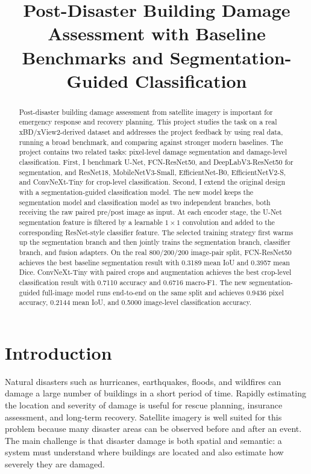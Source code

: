 \documentclass[10pt,conference]{IEEEtran}
\title{Post-Disaster Building Damage Assessment with Baseline Benchmarks and Segmentation-Guided Classification}
\author{
    \IEEEauthorblockN{Student Name}
    \IEEEauthorblockA{
        ECE 228 Project Report\\
        University of California, San Diego\\
        Email: your.email@ucsd.edu
    }
}
\begin{document}
\maketitle

\begin{abstract}
Post-disaster building damage assessment from satellite imagery is important for emergency response and recovery planning. This project studies the task on a real xBD/xView2-derived dataset and addresses the project feedback by using real data, running a broad benchmark, and comparing against stronger modern baselines. The project contains two related tasks: pixel-level damage segmentation and damage-level classification. First, I benchmark U-Net, FCN-ResNet50, and DeepLabV3-ResNet50 for segmentation, and ResNet18, MobileNetV3-Small, EfficientNet-B0, EfficientNetV2-S, and ConvNeXt-Tiny for crop-level classification. Second, I extend the original design with a segmentation-guided classification model. The new model keeps the segmentation model and classification model as two independent branches, both receiving the raw paired pre/post image as input. At each encoder stage, the U-Net segmentation feature is filtered by a learnable $1\times1$ convolution and added to the corresponding ResNet-style classifier feature. The selected training strategy first warms up the segmentation branch and then jointly trains the segmentation branch, classifier branch, and fusion adapters. On the real 800/200/200 image-pair split, FCN-ResNet50 achieves the best baseline segmentation result with 0.3189 mean IoU and 0.3957 mean Dice. ConvNeXt-Tiny with paired crops and augmentation achieves the best crop-level classification result with 0.7110 accuracy and 0.6716 macro-F1. The new segmentation-guided full-image model runs end-to-end on the same split and achieves 0.9436 pixel accuracy, 0.2144 mean IoU, and 0.5000 image-level classification accuracy.
\end{abstract}

\section{Introduction}
Natural disasters such as hurricanes, earthquakes, floods, and wildfires can damage a large number of buildings in a short period of time. Rapidly estimating the location and severity of damage is useful for rescue planning, insurance assessment, and long-term recovery. Satellite imagery is well suited for this problem because many disaster areas can be observed before and after an event. The main challenge is that disaster damage is both spatial and semantic: a system must understand where buildings are located and also estimate how severely they are damaged.
\end{document}
